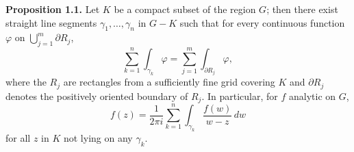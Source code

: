 \textbf{Proposition 1.1.} Let $K$ be a compact subset of the region $G$; then there exist straight line segments $\gamma_1, \ldots, \gamma_n$ in $G - K$ such that for every continuous function $\varphi$ on $\bigcup_{j=1}^{m} \partial R_j$,
$$\sum_{k=1}^{n} \int_{\gamma_k} \varphi = \sum_{j=1}^{m} \int_{\partial R_j} \varphi,$$
where the $R_j$ are rectangles from a sufficiently fine grid covering $K$ and $\partial R_j$ denotes the positively oriented boundary of $R_j$. In particular, for $f$ analytic on $G$,
$$f(z) = \frac{1}{2\pi i} \sum_{k=1}^{n} \int_{\gamma_k} \frac{f(w)}{w-z} \, dw$$
for all $z$ in $K$ not lying on any $\gamma_k$.
